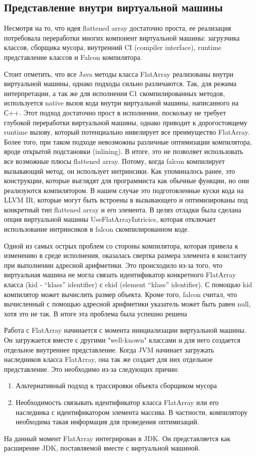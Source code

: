 \subsection{Представление внутри виртуальной машины}
Несмотря на то, что идея flattened array достаточно проста, ее реализация потребовала переработки многих компонент виртуальной машины: загрузчика классов, сборщика мусора, внутренний CI (compiler interface), runtime представление классов и Falcon компилятора.
\par 
Стоит отметить, что все Java методы класса FlatArray реализованы внутри виртуальной машины, однако подходы сильно различаются. Так, для режима интерпретации, а так же для исполнения С1 скомпилированных методов, используется native вызов кода внутри виртуальной машины, написанного на С++. Этот подход достаточно прост в исполнении, поскольку не требует глубокой переработки виртуальной машины, однако приводит к дорогостоящему runtime вызову, который потенциально нивелирует все преимущество FlatArray. Более того, при таком подходе невозможны различные оптимизации компилятора, вроде открытой подстановки (inlining).
В итоге, это не позволяет использовать все возможные плюсы flattened array. Потому, когда falcon компилирует вызывающий метод, он использует интринсики. Как упоминалось ранее, это конструкции, которые выглядят для программиста как обычные функции, но они реализуются компилятором. В нашем случае это подготовленные куски кода на LLVM IR, которые могут быть встроены в вызывающего и оптимизированы под конкретный тип flattened array и его элемента.
В целях отладки была сделана опция виртуальной машины UseFlatArrayIntricics, которая отключает использование интринсиков в falcon скомпилированном коде.   
\par
Одной из самых острых проблем со стороны компилятора, которая привела к изменению в среде исполнения, оказалась свертка размера элемента в константу при выполнении адресной арифметики. Это происходило из-за того, что виртуальная машина не могла связать идентификатор конкретного FlatArray класса (kid - “klass” identifier) с ekid (element “klass” identifier). С помощью kid компилятор может вычислить размер объекта. Кроме того, falcon считал, что вычисленный с помощью адресной арифметики указатель может быть равен null, хотя это не так. 
В итоге эта проблема была успешно решена
\par 
Работа с FlatArray начинается с момента инициализации виртуальной машины. Он загружается вместе с другими "well-known" классами и для него создается отдельное внутреннее представление. 
Когда JVM начинает загружать наследников класса FlatArray, она так же создает для них отдельное представление.
Это необходимо из-за следующих причин:
\begin{enumerate}
	\item Альтернативный подход к трассировки объекта сборщиком мусора
	\item Необходимость связывать идентификатор класса FlatArray или его наследника с идентификатором элемента массива. В частности, компилятору необходима такая информация для проведения оптимизаций.
\end{enumerate}
\par
На данный момент FlatArray интегрирован в JDK. Он представляется как расширение JDK, поставляемой вместе с виртуальной машиной.
